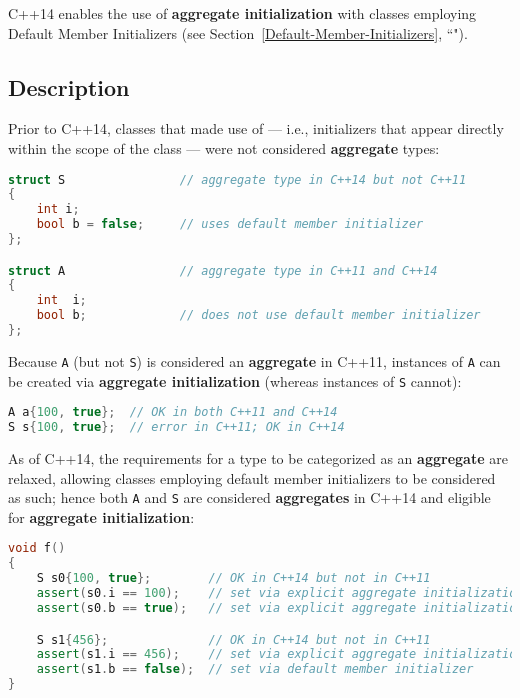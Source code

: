 
C++14 enables the use of \textbf{aggregate initialization} with classes
employing Default Member Initializers (see Section~\ref{Default-Member-Initializers}, ``").

\subsection[Description]{Description}\label{description}

Prior to C++14, classes that made use of  --- i.e., initializers that appear directly within the
scope of the class --- were not considered \textbf{aggregate} types:

\begin{lstlisting}[language=C++]
struct S                // aggregate type in C++14 but not C++11
{
    int i;
    bool b = false;     // uses default member initializer
};

struct A                // aggregate type in C++11 and C++14
{
    int  i;
    bool b;             // does not use default member initializer
};
\end{lstlisting}
    
\noindent Because \texttt{A} (but not \texttt{S}) is considered an \textbf{aggregate} in
C++11, instances of \texttt{A} can be created via \textbf{aggregate
initialization} (whereas instances of \texttt{S} cannot):

\begin{lstlisting}[language=C++]
A a{100, true};  // OK in both C++11 and C++14
S s{100, true};  // error in C++11; OK in C++14
\end{lstlisting}
    

\noindent As of C++14, the requirements for a type to be categorized as an
\textbf{aggregate} are relaxed, allowing classes employing default
member initializers to be considered as such; hence both \texttt{A} and
\texttt{S} are considered \textbf{aggregates} in C++14 and eligible for
\textbf{aggregate initialization}:

\begin{lstlisting}[language=C++]
void f()
{
    S s0{100, true};        // OK in C++14 but not in C++11
    assert(s0.i == 100);    // set via explicit aggregate initialization (above)
    assert(s0.b == true);   // set via explicit aggregate initialization (above)

    S s1{456};              // OK in C++14 but not in C++11
    assert(s1.i == 456);    // set via explicit aggregate initialization (above)
    assert(s1.b == false);  // set via default member initializer
}
\end{lstlisting}
    

